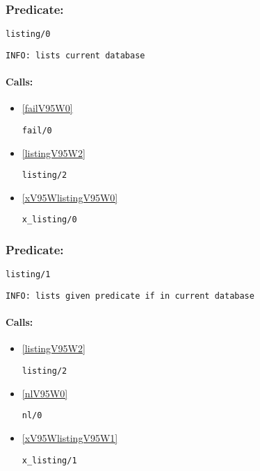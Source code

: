 \subsubsection{Predicate:} \label{listingV95W0}

\begin{verbatim}
listing/0
\end{verbatim}

{\small \begin{verbatim}
INFO: lists current database

\end{verbatim}}
\paragraph{Calls:} 
\begin{itemize}
\item \ref{failV95W0} 
\begin{verbatim}
fail/0
\end{verbatim}

\item \ref{listingV95W2} 
\begin{verbatim}
listing/2
\end{verbatim}

\item \ref{xV95WlistingV95W0} 
\begin{verbatim}
x_listing/0
\end{verbatim}

\end{itemize}

\subsubsection{Predicate:} \label{listingV95W1}

\begin{verbatim}
listing/1
\end{verbatim}

{\small \begin{verbatim}
INFO: lists given predicate if in current database

\end{verbatim}}
\paragraph{Calls:} 
\begin{itemize}
\item \ref{listingV95W2} 
\begin{verbatim}
listing/2
\end{verbatim}

\item \ref{nlV95W0} 
\begin{verbatim}
nl/0
\end{verbatim}

\item \ref{xV95WlistingV95W1} 
\begin{verbatim}
x_listing/1
\end{verbatim}

\end{itemize}

